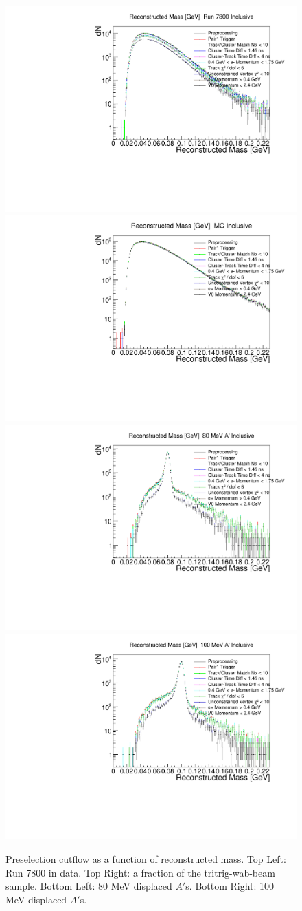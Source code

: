 \begin{figure}[t]
    \centering
    \includegraphics[width=.45\textwidth]{figs/recon/pre_cutflow_uncM_data.pdf}
    \includegraphics[width=.45\textwidth]{figs/recon/pre_cutflow_uncM_mc.pdf}
    \includegraphics[width=.45\textwidth]{figs/recon/pre_cutflow_uncM_ap80.pdf}
    \includegraphics[width=.45\textwidth]{figs/recon/pre_cutflow_uncM_ap100.pdf}
    \caption{Preselection cutflow as a function of reconstructed mass. Top Left: Run 7800 in data. Top Right: a fraction of the tritrig-wab-beam sample. Bottom Left: 80 MeV displaced $A'$s. Bottom Right: 100 MeV displaced $A'$s.}
    \label{fig:pre_cutflow_m}
\end{figure}

